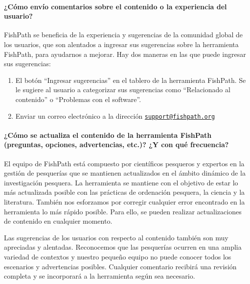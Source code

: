 \documentclass[
  11pt,
]{book}
\providecommand{\tightlist}{%
  \setlength{\itemsep}{0pt}\setlength{\parskip}{0pt}}
\begin{document}
\hypertarget{faq-feedback}{%
\paragraph{¿Cómo envío comentarios sobre el contenido o la experiencia del usuario?}\label{faq-feedback}}

FishPath se beneficia de la experiencia y sugerencias de la comunidad global de los usuarios, que son alentados a ingresar sus sugerencias sobre la herramienta FishPath, para ayudarnos a mejorar. Hay dos maneras en las que puede ingresar sus sugerencias:

\begin{enumerate}
\def\labelenumi{\arabic{enumi}.}
\tightlist
\item
  El botón ``Ingresar sugerencias'' en el tablero de la herramienta FishPath. Se le sugiere al usuario a categorizar sus sugerencias como ``Relacionado al contenido'' o ``Problemas con el software''.
\item
  Enviar un correo electrónico a la dirección \href{mailto:support@fishpath.org}{\nolinkurl{support@fishpath.org}}
\end{enumerate}

\hypertarget{faq-content-updates}{%
\paragraph{¿Cómo se actualiza el contenido de la herramienta FishPath (preguntas, opciones, advertencias, etc.)? ¿Y con qué frecuencia?}\label{faq-content-updates}}

El equipo de FishPath está compuesto por científicos pesqueros y expertos en la gestión de pesquerías que se mantienen actualizados en el ámbito dinámico de la investigación pesquera. La herramienta se mantiene con el objetivo de estar lo más actualizada posible con las prácticas de ordenación pesquera, la ciencia y la literatura. También nos esforzamos por corregir cualquier error encontrado en la herramienta lo más rápido posible. Para ello, se pueden realizar actualizaciones de contenido en cualquier momento.

Las sugerencias de los usuarios con respecto al contenido también son muy apreciadas y alentadas. Reconocemos que las pesquerías ocurren en una amplia variedad de contextos y nuestro pequeño equipo no puede conocer todos los escenarios y advertencias posibles. Cualquier comentario recibirá una revisión completa y se incorporará a la herramienta según sea necesario.
\end{document}
